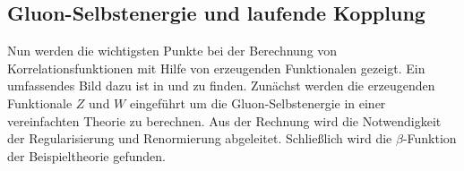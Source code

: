     

    
    
  \subsection{Gluon-Selbstenergie und laufende Kopplung}\label{selbstenergie}
    Nun werden 
    die wichtigsten Punkte bei der Berechnung von Korrelationsfunktionen mit 
    Hilfe von erzeugenden Funktionalen gezeigt. Ein umfassendes Bild 
    dazu ist in \cite{Schwartz} und \cite{Zinn} zu finden.
    Zunächst werden die erzeugenden Funktionale $Z$ und $W$ eingeführt um 
    die Gluon-Selbstenergie in einer vereinfachten Theorie zu berechnen. Aus der 
    Rechnung wird die 
    Notwendigkeit der Regularisierung und Renormierung abgeleitet. Schließlich 
    wird die $\beta$-Funktion der Beispieltheorie gefunden.
    
